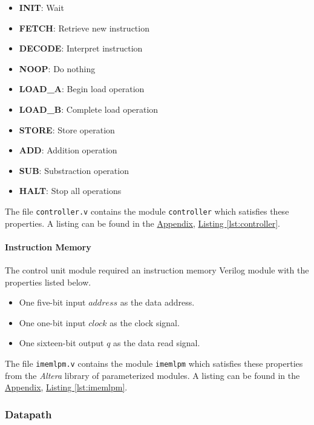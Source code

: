 \begin{itemize}
    \begin{itemize}
        \item \textbf{INIT}: Wait
        \item \textbf{FETCH}: Retrieve new instruction
        \item \textbf{DECODE}: Interpret instruction
        \item \textbf{NOOP}: Do nothing
        \item \textbf{LOAD\_A}: Begin load operation
        \item \textbf{LOAD\_B}: Complete load operation
        \item \textbf{STORE}: Store operation
        \item \textbf{ADD}: Addition operation
        \item \textbf{SUB}: Substraction operation
        \item \textbf{HALT}: Stop all operations
    \end{itemize}
\end{itemize}

The file \verb|controller.v| contains the module \verb|controller| which satisfies these properties.
A listing can be found in the \hyperref[sec:appendix]{Appendix}, \hyperref[lst:controller]{Listing \ref*{lst:controller}}.

\paragraph{Instruction Memory} \label{par:imem}

The control unit module required an instruction memory Verilog module with the properties listed below.

\begin{itemize}
    \item One five-bit input $address$ as the data address.
    \item One one-bit input $clock$ as the clock signal.
    \item One sixteen-bit output $q$ as the data read signal.
\end{itemize}

The file \verb|imemlpm.v| contains the module \verb|imemlpm| which satisfies these properties from the \emph{Altera} library of parameterized modules.
A listing can be found in the \hyperref[sec:appendix]{Appendix}, \hyperref[lst:imemlpm]{Listing \ref*{lst:imemlpm}}.

\subsubsection{Datapath} \label{subsub:datapath}

